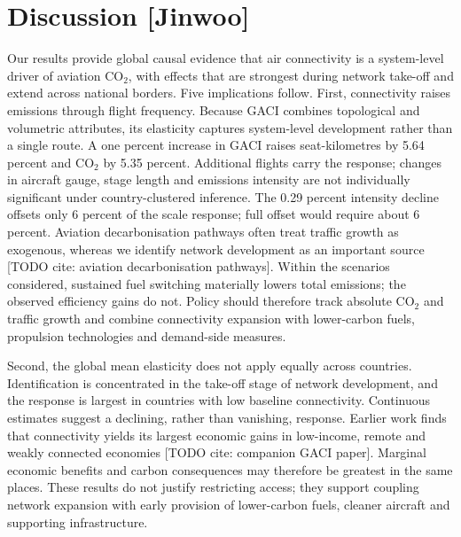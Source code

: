 \documentclass[12pt]{article}
\begin{document}
\section*{Discussion [Jinwoo]}
Our results provide global causal evidence that air connectivity is a system-level driver of aviation CO$_2$, with effects that are strongest during network take-off and extend across national borders. Five implications follow. First, connectivity raises emissions through flight frequency. Because GACI combines topological and volumetric attributes, its elasticity captures system-level development rather than a single route. A one percent increase in GACI raises seat-kilometres by 5.64 percent and CO$_2$ by 5.35 percent. Additional flights carry the response; changes in aircraft gauge, stage length and emissions intensity are not individually significant under country-clustered inference. The 0.29 percent intensity decline offsets only 6 percent of the scale response; full offset would require about 6 percent. Aviation decarbonisation pathways often treat traffic growth as exogenous, whereas we identify network development as an important source [TODO cite: aviation decarbonisation pathways]. Within the scenarios considered, sustained fuel switching materially lowers total emissions; the observed efficiency gains do not. Policy should therefore track absolute CO$_2$ and traffic growth and combine connectivity expansion with lower-carbon fuels, propulsion technologies and demand-side measures.

Second, the global mean elasticity does not apply equally across countries. Identification is concentrated in the take-off stage of network development, and the response is largest in countries with low baseline connectivity. Continuous estimates suggest a declining, rather than vanishing, response. Earlier work finds that connectivity yields its largest economic gains in low-income, remote and weakly connected economies [TODO cite: companion GACI paper]. Marginal economic benefits and carbon consequences may therefore be greatest in the same places. These results do not justify restricting access; they support coupling network expansion with early provision of lower-carbon fuels, cleaner aircraft and supporting infrastructure.
\end{document}
